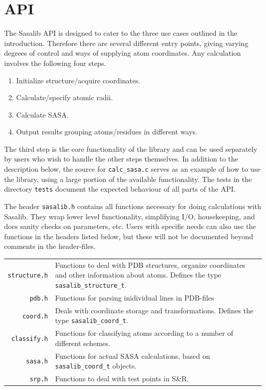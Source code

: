 \documentclass[a4paper,11pt]{article}
\begin{document}
\section{API} \label{sec:using}

The Sasalib API is designed to cater to the three use cases outlined
in the introduction. Therefore there are several different entry
points, giving varying degrees of control and ways of supplying atom
coordinates. Any calculation involves the following four steps.
\begin{enumerate}
  \item Initialize structure/acquire coordinates.
  \item Calculate/specify atomic radii.
  \item Calculate SASA.
  \item Output results grouping atoms/residues in different ways.
\end{enumerate}
The third step is the core functionality of the library and can be
used separately by users who wish to handle the other steps
themselves. In addition to the description below, the source for
\texttt{calc\_sasa.c} serves as an example of how to use the library,
using a large portion of the available functionality. The tests in the
directory \verb|tests| document the expected behaviour of all parts of
the API.

The header \texttt{sasalib.h} contains all functions necessary for
doing calculations with Sasalib. They wrap lower level functionality,
simplifying I/O, housekeeping, and does sanity checks on parameters,
etc. Users with specific needs can also use the functions in the
headers listed below, but these will not be documented beyond comments
in the header-files.

\begin{tabular}{r>{\raggedright\arraybackslash}p{}}
\texttt{structure.h} & Functions to deal with PDB structures,  
                       organize coordinates and other information
                       about atoms. Defines the type 
                       \verb|sasalib_structure_t|.\\
\texttt{pdb.h} & Functions for parsing inidividual lines in PDB-files \\
\texttt{coord.h} & Deals with coordinate storage and transformations. Defines
                   the type \verb|sasalib_coord_t|.\\
\texttt{classify.h} & Functions for classifying atoms according
                      to a number of different schemes.\\
\texttt{sasa.h} & Functions for actual SASA calculations, based on
                  \verb|sasalib_coord_t| objects.\\
\texttt{srp.h} & Functions to deal with test points in S\&R. \\
\end{tabular}
\end{document}
